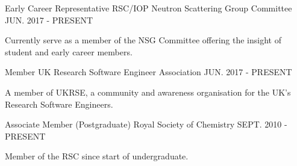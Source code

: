 \begin{cventries}
  \cventry
  	{Early Career Representative}
    {RSC/IOP Neutron Scattering Group Committee}
    {}
    {JUN. 2017 - PRESENT}
    {
      \begin{cvitems}
      	\item {Currently serve as a member of the NSG Committee offering the insight of student and early career members.}
	  \end{cvitems}
	}
  \cventry
    {Member}
    {UK Research Software Engineer Association}
    {}
    {JUN. 2017 - PRESENT}
    {
	  \begin{cvitems}
	  	\item{A member of UKRSE, a community and awareness organisation for the UK's Research Software Engineers.}
	  \end{cvitems}
    }
  \cventry
    {Associate Member (Postgraduate)}
    {Royal Society of Chemistry}
    {}
    {SEPT. 2010 - PRESENT}
    {
      \begin{cvitems}
      	\item {Member of the RSC since start of undergraduate.}
      \end{cvitems}
    }
\end{cventries}
